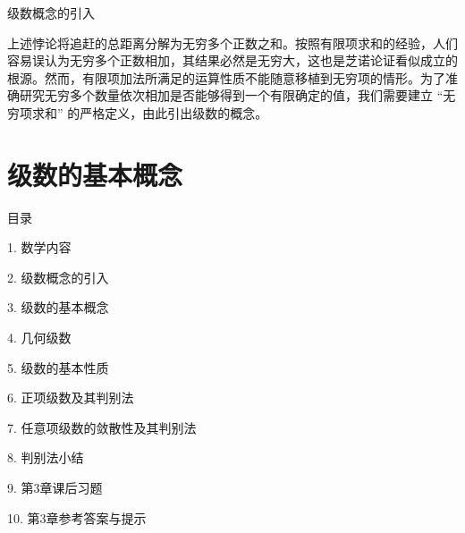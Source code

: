 \documentclass[aspectratio=169,10pt,fontset=fandol]{ctexbeamer}
\begin{document}
\begin{frame}[t,fragile]{级数概念的引入}
\normalsize
{\normalsize




上述悖论将追赶的总距离分解为无穷多个正数之和。按照有限项求和的经验，人们容易误认为无穷多个正数相加，其结果必然是无穷大，这也是芝诺论证看似成立的根源。然而，有限项加法所满足的运算性质不能随意移植到无穷项的情形。为了准确研究无穷多个数量依次相加是否能够得到一个有限确定的值，我们需要建立 “无穷项求和” 的严格定义，由此引出级数的概念。










}
\end{frame}
\section{级数的基本概念}
\begin{frame}[t,fragile]{目录}
\normalsize
{\color{black}\normalsize 1. 数学内容\par}\vspace{0.3em}
{\color{black}\normalsize 2. 级数概念的引入\par}\vspace{0.3em}
{\color{blue}\normalsize 3. 级数的基本概念\par}\vspace{0.3em}
{\color{gray!40}\normalsize 4. 几何级数\par}\vspace{0.3em}
{\color{gray!40}\normalsize 5. 级数的基本性质\par}\vspace{0.3em}
{\color{gray!40}\normalsize 6. 正项级数及其判别法\par}\vspace{0.3em}
{\color{gray!40}\normalsize 7. 任意项级数的敛散性及其判别法\par}\vspace{0.3em}
{\color{gray!40}\normalsize 8. 判别法小结\par}\vspace{0.3em}
{\color{gray!40}\normalsize 9. 第3章课后习题\par}\vspace{0.3em}
{\color{gray!40}\normalsize 10. 第3章参考答案与提示\par}\vspace{0.3em}
\end{frame}
\end{document}

